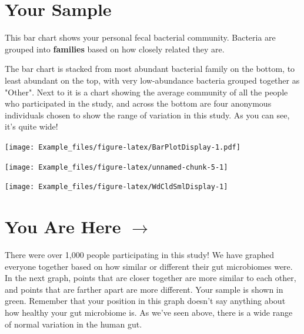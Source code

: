 \documentclass[
]{article}
\begin{document}
\vspace{1.5cm}

\begin{multicols}{2}

\section{Your Sample}

\begin{small}
This bar chart shows your personal fecal bacterial community. 
Bacteria are grouped into \textbf{families} based on how closely related
they are.

The bar chart is stacked from most abundant bacterial family on the 
bottom, to least abundant on the top, with very low-abundance 
bacteria grouped together as "Other". Next to it is a chart showing
the average community of all the people who participated in the study,
and across the bottom are four anonymous individuals chosen to show
the range of variation in this study. As you can see, it's quite wide!
\end{small}

\texttt{[image: Example\_files/figure-latex/BarPlotDisplay-1.pdf]}

\begin{center}\texttt{[image: Example\_files/figure-latex/unnamed-chunk-5-1]} \end{center}

\begin{center}\texttt{[image: Example\_files/figure-latex/WdCldSmlDisplay-1]} \end{center}

\section{You Are Here $\boldsymbol{\rightarrow}$}

\begin{small}
There were over 1,000 people participating in this study! We have 
graphed everyone together based on how similar or different their gut
microbiomes were. In the next graph, points that are closer together
are more similar to each other, and points that are farther apart are
more different. Your sample is shown in green. Remember that your 
position in this graph doesn't say anything about how healthy your
gut microbiome is. As we've seen above, there is a wide range of 
normal variation in the human gut.
\end{small}


\end{multicols}
\end{document}
